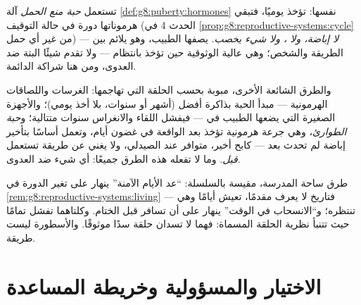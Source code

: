 \begin{definition}\label{def:g8:contraception:pill}
تستعمل \emph{حبة منع الحمل} آلة
\cref{def:g8:puberty:hormones} نفسها: تؤخذ يوميًا، فتبقي
هرموناتها دورة  في حالة التوقيف (الحدث 4 في
\cref{prop:g8:reproductive-systems:cycle} من غير أي حمل)
--- \emph{لا إباضة، ولا ، ولا شيء يخصب}. يصفها
الطبيب، وهو يلائم بين الطريقة والشخص؛ وهي عالية الوثوقية
حين تؤخذ بانتظام --- ولا تقدم شيئًا البتة ضد العدوى، ومن
هنا شراكة  الدائمة.
\end{definition}

\begin{example}\label{ex:g8:contraception:shelf}
والطرق الشائعة الأخرى، مبوبة بحسب الحلقة التي تهاجمها:
الغرسات واللصاقات الهرمونية --- مبدأ الحبة بذاكرة أفضل
(أشهر أو سنوات، بلا أخذ يومي)؛ والأجهزة الصغيرة التي
يضعها الطبيب في  --- فيفشل اللقاء والانغراس سنوات
متتالية؛ و\emph{حبة الطوارئ}، وهي جرعة هرمونية تؤخذ بعد
الواقعة في غضون أيام، وتعمل أساسًا بتأخير إباضة لم تحدث
بعد --- كابح أخير، متوافر عند الصيدلي، ولا يغني عن طريقة
تستعمل \emph{قبل}. وما لا تفعله هذه الطرق جميعًا: أي شيء
ضد العدوى.
\end{example}

\begin{remark}[ما لا ينفع]\label{rem:g8:contraception:notwork}
طرق ساحة المدرسة، مقيسة بالسلسلة: ``عد الأيام الآمنة''
ينهار على تغير الدورة في
\cref{rem:g8:reproductive-systems:living} --- فتاريخ
 لا يعرف مقدمًا،  تعيش أيامًا وهي تنتظره؛
و``الانسحاب في الوقت'' ينهار على أن  تسافر قبل
الختام. وكلتاهما تفشل تمامًا حيث تتنبأ نظرية الحلقة
المسماة: فهما لا تسدان حلقة سدًا موثوقًا. والأسطورة ليست
طريقة.
\end{remark}

\section{الاختيار والمسؤولية وخريطة المساعدة}

